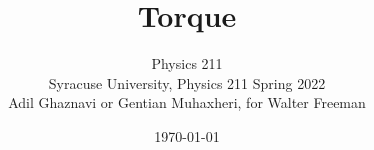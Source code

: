 \documentclass[10pt]{beamer}
\title{
  \textbf {Torque}\\
}
\author[W. Freeman / A. Ghaznavi / G. Muhaxheri] {Physics 211\\Syracuse University, Physics 211 Spring 2022\\Adil Ghaznavi or Gentian Muhaxheri, for Walter Freeman}
\date{\today}
\def\BI{\begin{itemize}}
\def\EI{\end{itemize}}
\def\BS{\bigskip}
\begin{document}
\frame{\titlepage}


%
%
%
%
%
%
%
%
%
%
%
%
%
%
%
%
%
%
%
%
%
%
%
%
%
%
%
%
%
\end{document}
